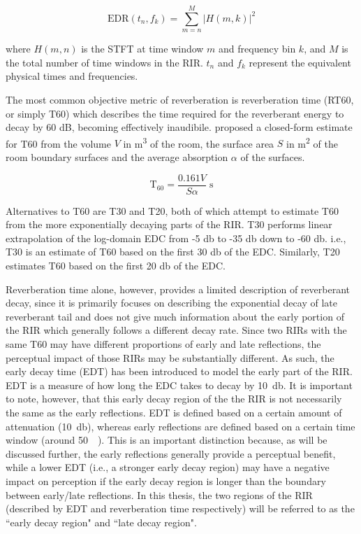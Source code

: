 \begin{equation}
	\mathrm{EDR}(t_n,f_k)=\sum_{m=n}^{M}|H(m,k)|^2
\end{equation}

\noindent
where $H(m,n)$ is the STFT at time window $m$ and frequency bin $k$, and $M$ is the total number of time windows in the RIR. $t_n$ and $f_k$ represent the equivalent physical times and frequencies.

The most common objective metric of reverberation is reverberation time (RT60, or simply T60) which describes the time required for the reverberant energy to decay by 60 dB, becoming effectively inaudibile. \cite{sabine1922collected} proposed a closed-form estimate for T60 from the volume $V$ in \unit{\metre\cubed} of the room, the surface area $S$ in \unit{\metre\squared} of the room boundary surfaces and the average absorption $\alpha$ of the surfaces.

\begin{equation}
	\mathrm{T}_{60}=\frac{0.161V}{S\alpha}\;\unit{\second}
\end{equation}

Alternatives to T60 are T30 and T20, both of which attempt to estimate T60 from the more exponentially decaying parts of the RIR. T30 performs linear extrapolation of the log-domain EDC from -5 \unit{\decibel} to -35 \unit{\decibel} down to -60 \unit{\decibel}. i.e., T30 is an estimate of T60 based on the first 30 \unit{\decibel} of the EDC. Similarly, T20 estimates T60 based on the first 20 \unit{\decibel} of the EDC. 

Reverberation time alone, however, provides a limited description of reverberant decay, since it is primarily focuses on describing the exponential decay of late reverberant tail and does not give much information about the early portion of the RIR which generally follows a different decay rate. Since two RIRs with the same T60 may have different proportions of early and late reflections, the perceptual impact of those RIRs may be substantially different. As such, the early decay time (EDT) has been introduced to model the early part of the RIR. EDT is a measure of how long the EDC takes to decay by \qty{10}{\decibel}. It is important to note, however, that this early decay region of the the RIR is not necessarily the same as the early reflections. EDT is defined based on a certain amount of attenuation (\qty{10}{\decibel}), whereas early reflections are defined based on a certain time window (around \qty{50}{\milli\sec}). This is an important distinction because, as will be discussed further, the early reflections generally provide a perceptual benefit, while a lower EDT (i.e., a stronger early decay region) may have a negative impact on perception if the early decay region is longer than the boundary between early/late reflections. In this thesis, the two regions of the RIR (described by EDT and reverberation time respectively) will be referred to as the ``early decay region" and ``late decay region".

